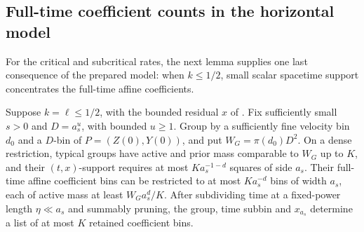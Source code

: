 \subsection{Full-time coefficient counts in the horizontal model}

For the critical and subcritical rates, the next lemma supplies one
last consequence of the prepared model: when \(k\le1/2\), small
scalar spacetime support concentrates the full-time affine coefficients.


\begin{lemma}\label{a06:horizontal-coefficient-count}
Suppose \(k=\ell\leq1/2\), with the bounded residual
\(x\) of .  Fix sufficiently small
\(s>0\) and \(D=a_s^u\), with bounded \(u\geq1\).
Group by a sufficiently fine velocity bin \(d_0\) and a
\(D\)-bin of \(P=(Z(0),Y(0))\), and put \(W_G=\pi(d_0)D^2\).
On a dense restriction, typical groups have active and prior mass
comparable to \(W_G\) up to \(K\), and their \((t,x)\)-support
requires at most \(K a_s^{-1-d}\) squares of side \(a_s\).
Their full-time affine coefficient bins can be restricted to
at most \(K a_s^{-d}\) bins of width \(a_s\), each of active
mass at least \(W_Ga_s^d/K\).
After subdividing time at a fixed-power length \(\eta\ll a_s\)
and summably pruning, the group, time subbin and \(x_{a_s}\)
determine a list of at most \(K\) retained coefficient bins.
\end{lemma}
